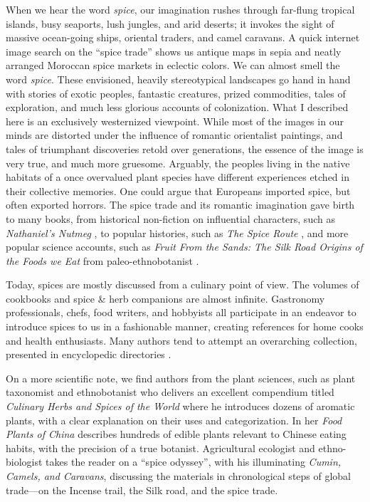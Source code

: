 When we hear the word \textit{spice}, our imagination rushes through far-flung tropical islands, busy seaports, lush jungles, and arid deserts; it invokes the sight of massive ocean-going ships, oriental traders, and camel caravans. A quick internet image search on the ``spice trade'' shows us antique maps in sepia and neatly arranged Moroccan spice markets in eclectic colors. We can almost smell the word \textit{spice}. These envisioned, heavily stereotypical landscapes go hand in hand with stories of exotic peoples, fantastic creatures, prized commodities, tales of exploration, and much less glorious accounts of colonization. What I described here is an exclusively westernized viewpoint. While most of the images in our minds are distorted under the influence of romantic orientalist paintings, and tales of triumphant discoveries retold over generations, the essence of the image is very true, and much more gruesome. Arguably, the peoples living in the native habitats of a once overvalued plant species have different experiences etched in their collective memories. One could argue that Europeans imported spice, but often exported horrors. The spice trade and its romantic imagination gave birth to many books, from historical non-fiction on influential characters, such as \textit{Nathaniel's Nutmeg} \autocite{milton_nathaniels_1999}, to popular histories, such as \textit{The Spice Route} \autocite{keay_spice_2006}, and more popular science accounts, such as \textit{Fruit From the Sands: The Silk Road Origins of the Foods we Eat} from paleo-ethnobotanist \textcite{spengler_fruit_2019}. 

Today, spices are mostly discussed from a culinary point of view. The volumes of cookbooks and spice \& herb companions are almost infinite. Gastronomy professionals, chefs, food writers, and hobbyists all participate in an endeavor to introduce spices to us in a fashionable manner, creating references for home cooks and health enthusiasts. Many authors tend to attempt an overarching collection, presented in encyclopedic directories \autocite{farrell_spices_1985,craze_spice_1997,herman_herb_2015,norman_herbs_2015,lakshmi_encyclopedia_2016,oconnell_book_2016,opara_culinary_2021}. 

On a more scientific note, we find authors from the plant sciences, such as plant taxonomist and ethnobotanist \textcite{van_wyk_culinary_2014} who delivers an excellent compendium titled \textit{Culinary Herbs and Spices of the World} where he introduces dozens of aromatic plants, with a clear explanation on their uses and categorization. In her \textit{Food Plants of China} \textcite{hu_food_2005} describes hundreds of edible plants relevant to Chinese eating habits, with the precision of a true botanist. Agricultural ecologist and ethno-biologist \textcite{nabhan_cumin_2014} takes the reader on a ``spice odyssey'', with his illuminating \textit{Cumin, Camels, and Caravans}, discussing the materials in chronological steps of global trade---on the Incense trail, the Silk road, and the spice trade.

